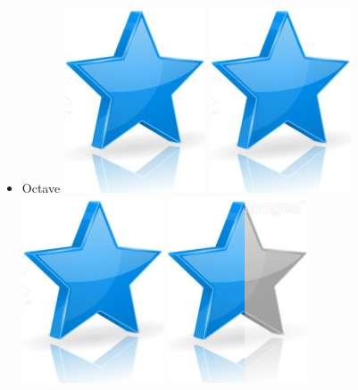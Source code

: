 \documentclass[10pt,a4paper,sans]{article}
\begin{document}
\begin{minipage}[t]{0.26\textwidth}
\begin{mdframed}[style=cadreCompetences]
\begin{itemize}
                \item{Octave
                    \hfill
                    \includegraphics[scale=0.20]{img/star.png} \hspace{-0.2cm}
                    \includegraphics[scale=0.20]{img/star.png} \hspace{-0.2cm}
                    \includegraphics[scale=0.20]{img/star.png} \hspace{-0.2cm}
                    \includegraphics[scale=0.20]{img/half_star.png} \hspace{-0.2cm}
}
\end{itemize}
\end{mdframed}
\end{minipage}
\end{document}
